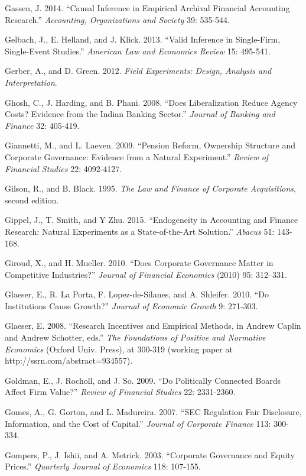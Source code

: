 \noindent Gassen, J. 2014.  ``Causal Inference in Empirical Archival Financial Accounting Research.'' \textit{Accounting, Organizations and Society }39: 535-544.

\noindent Gelbach, J., E. Helland, and J. Klick. 2013. ``Valid Inference in Single-Firm, Single-Event Studies.''  \textit{American Law and Economics Review} 15: 495-541.

\noindent Gerber, A., and D. Green.  2012.  \textit{Field Experiments:  Design, Analysis and Interpretation}.

\noindent Ghosh, C., J. Harding, and B. Phani. 2008. ``Does Liberalization Reduce Agency Costs? Evidence from the Indian Banking Sector.'' \textit{Journal of Banking and Finance} 32: 405-419.

\noindent Giannetti, M., and L. Laeven. 2009. ``Pension Reform, Ownership Structure and Corporate Governance:  Evidence from a Natural Experiment.''  \textit{Review of Financial Studies} 22: 4092-4127.

\noindent Gilson, R., and B. Black. 1995. \textit{The Law and Finance of Corporate Acquisitions}, second edition.

\noindent Gippel, J., T. Smith, and Y Zhu.  2015.  ``Endogeneity in Accounting and Finance Research:  Natural Experiments as a State-of-the-Art Solution.''  \textit{Abacus} 51:  143-168. 

\noindent Giroud, X., and H. Mueller. 2010. ``Does Corporate Governance Matter in Competitive Industries?'' \textit{Journal of Financial Economics} (2010) 95: 312--331.

\noindent Glaeser, E., R. La Porta, F. Lopez-de-Silanes, and A. Shleifer. 2010. ``Do Institutions Cause Growth?'' \textit{Journal of Economic Growth} 9: 271-303.

\noindent Glaeser, E. 2008. ``Research Incentives and Empirical Methods, in Andrew Caplin and Andrew Schotter, eds.'' \textit{The Foundations of Positive and Normative Economics} (Oxford Univ. Press), at 300-319 (working paper at http://ssrn.com/abstract=934557).

\noindent Goldman, E., J. Rocholl, and J. So. 2009. ``Do Politically Connected Boards Affect Firm Value?'' \textit{Review of Financial Studies} 22: 2331-2360. 

\noindent Gomes, A., G. Gorton, and L. Madureira. 2007. ``SEC Regulation Fair Disclosure, Information, and the Cost of Capital.'' \textit{Journal of Corporate Finance} 113: 300-334.

\noindent Gompers, P., J. Ishii, and A. Metrick. 2003. ``Corporate Governance and Equity Prices.'' \textit{Quarterly Journal of Economics} 118: 107-155.


